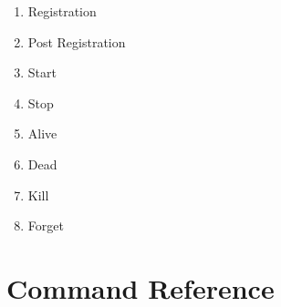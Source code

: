 \begin{enumerate}[noitemsep]
\item \label{srvtrans:reg} Registration
\item \label{srvtrans:postreg} Post Registration
\item \label{srvtrans:start} Start
\item \label{srvtrans:stop} Stop
\item \label{srvtrans:alive} Alive
\item \label{srvtrans:dead} Dead
\item \label{srvtrans:kill} Kill
\item \label{srvtrans:forget} Forget
\end{enumerate}

\section{Command Reference}
\label{sec:mem:commands}

